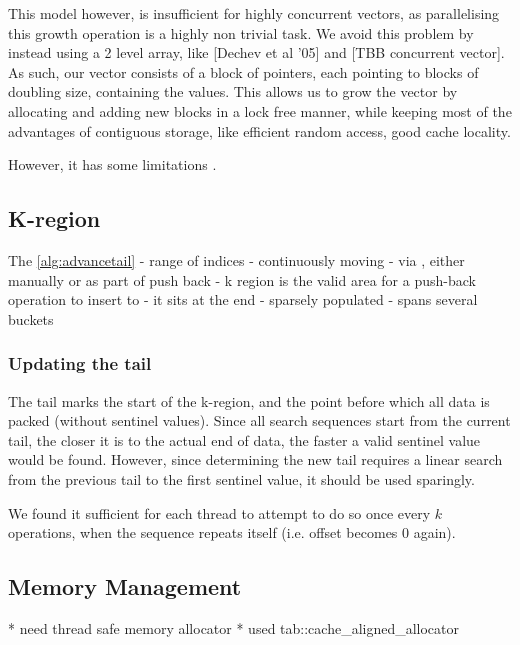 \documentclass{sigplanconf}
\begin{document}
This model however, is insufficient for highly concurrent vectors, as parallelising this growth operation is a highly non trivial task. We avoid this problem by instead using a 2 level array, like [Dechev et al '05] and [TBB concurrent vector]. As such, our vector consists of a block of pointers, each pointing to blocks of doubling size, containing the values. This allows us to grow the vector by allocating and adding new blocks in a lock free manner, while keeping most of the advantages of contiguous storage, like efficient random access, good cache locality.

However, it has some limitations \cite{dechev06}.

\subsection{K-region}
The \ref{alg:advancetail}
- range of indices
- continuously moving
  - via , either manually or as part of push back
- k region is the valid area for a push-back operation to insert to
- it sits at the end
- sparsely populated
- spans several buckets

\subsubsection{Updating the tail}

The tail marks the start of the k-region, and the point before which
all data is packed (without sentinel values). Since all search sequences
start from the current tail, the closer it is to the actual end of
data, the faster a valid sentinel value would be found. However, since
determining the new tail requires a linear search from the previous
tail to the first sentinel value, it should be used sparingly.

We found it sufficient for each thread to attempt to do so once every
$k$ operations, when the sequence repeats itself (i.e. offset becomes
0 again).

\subsection{Memory Management}
* need thread safe memory allocator
* used tab::cache\_aligned\_allocator
\end{document}
